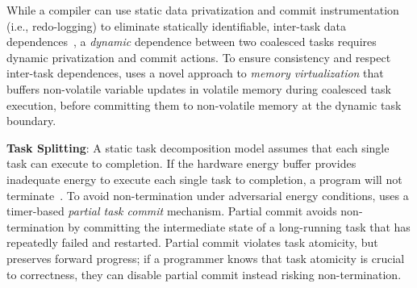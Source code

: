 %
%
While a compiler can use static data privatization and commit instrumentation
(i.e., redo-logging) to eliminate statically identifiable, inter-task data
dependences~\citep{alpaca}, a \emph{dynamic} dependence between two coalesced
tasks requires dynamic privatization and commit actions. 
%
To ensure consistency and respect inter-task dependences, \sys uses a novel
approach to \emph{memory virtualization} that buffers non-volatile variable
updates in volatile memory during coalesced task execution, before committing
them to non-volatile memory at the dynamic task boundary.
%

\textbf{Task Splitting}: A static task decomposition model assumes that each
single task can execute to completion.  If the hardware energy buffer provides
inadequate energy to execute each single task to completion, a program will not
terminate~\cite{cleancut}. To avoid non-termination under adversarial 
energy conditions, \sys uses a timer-based {\em partial task commit} mechanism.
Partial commit avoids non-termination by committing the intermediate state of a long-running
task that has repeatedly failed and restarted.  Partial commit violates
task atomicity, but preserves forward progress; if a programmer knows that
task atomicity is crucial to correctness, they can disable partial commit
instead risking non-termination.

%

